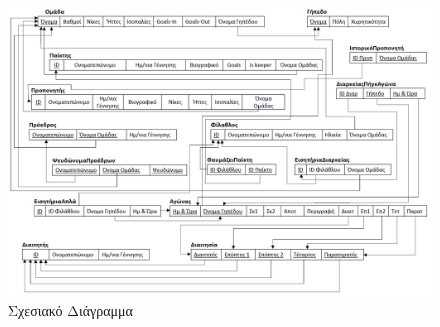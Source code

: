\documentclass[a4paper,oneside,titlepage,11pt]{article}
\begin{document}
\begin{landscape}
\begin{figure}
\centering
\includegraphics[scale=0.75]{sxesiako} 
\caption{Σχεσιακό Διάγραμμα}
\end{figure}
\end{landscape}
\end{document}
